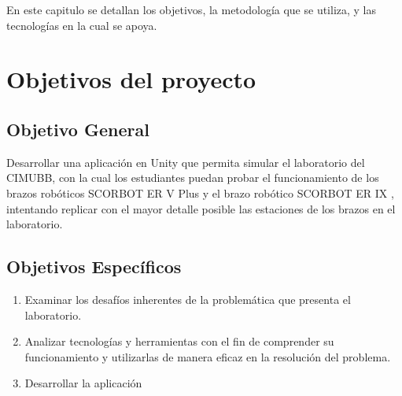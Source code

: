 En este capitulo se detallan los objetivos, la metodología que se utiliza, y las tecnologías en la cual se apoya.

\section{Objetivos del proyecto}

\subsection{Objetivo General}
Desarrollar una aplicación en Unity que permita simular el laboratorio
del CIMUBB, con la cual los estudiantes puedan probar el funcionamiento de los
brazos robóticos SCORBOT ER V Plus y el brazo robótico SCORBOT ER IX , intentando replicar con el mayor detalle posible
las estaciones de los brazos en el laboratorio.

\subsection{Objetivos Específicos}
\begin{enumerate}[label=\roman*.-]
\item Examinar los desafíos inherentes de la problemática que presenta el laboratorio.
\item Analizar tecnologías y herramientas con el fin de comprender su funcionamiento y utilizarlas de manera eficaz en la resolución del problema.
\item Desarrollar la aplicación
\end{enumerate}


